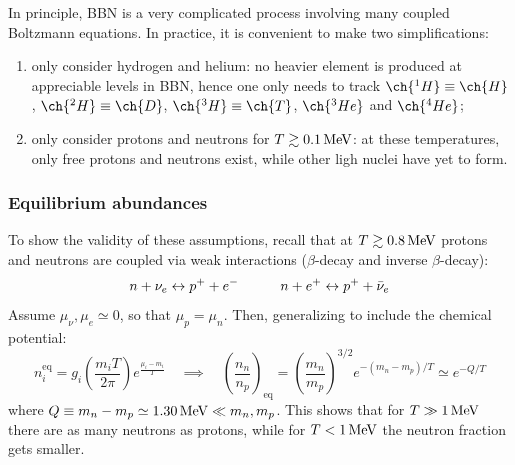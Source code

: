 In principle, BBN is a very complicated process involving many coupled Boltzmann equations. In practice, it is convenient to make two simplifications:
\begin{enumerate}
  \item only consider hydrogen and helium: no heavier element is produced at appreciable levels in BBN, hence one only needs to track $ \ch{^1H} \equiv \ch{H} $, $ \ch{^2H} \equiv \ch{D} $, $ \ch{^3H} \equiv \ch{T} $, $ \ch{^3He} $ and $ \ch{^4He} $;
  \item only consider protons and neutrons for $ T \gtrsim 0.1 \,\mathrm{MeV} $: at these temperatures, only free protons and neutrons exist, while other ligh nuclei have yet to form.
\end{enumerate}

\subsubsection{Equilibrium abundances}

 To show the validity of these assumptions, recall that at $ T \gtrsim 0.8 \,\mathrm{MeV} $ protons and neutrons are coupled via weak interactions ($ \beta $-decay and inverse $ \beta $-decay):
\begin{equation*}
  n + \nu_e \leftrightarrow p^+ + e^-
  \quad \qquad
  n + e^+ \leftrightarrow p^+ + \bar\nu_e
\end{equation*}
Assume $ \mu_\nu , \mu_e \simeq 0 $, so that $ \mu_p = \mu_n $. Then, generalizing  to include the chemical potential:
\begin{equation}
  n_i^\text{eq} = g_i \left( \frac{m_i T}{2\pi} \right) e^\frac{\mu_i - m_i}{T}
  \quad \implies \quad
  \left( \frac{n_n}{n_p} \right)_\text{eq} = \left( \frac{m_n}{m_p} \right)^{3/2} e^{-(m_n - m_p) /T} \simeq e^{-Q/T}
  \label{eq:n-to-p}
\end{equation}
where $ Q \equiv m_n - m_p \simeq 1.30 \,\mathrm{MeV} \ll m_n , m_p $. This shows that for $ T \gg 1 \,\mathrm{MeV} $ there are as many neutrons as protons, while for $ T < 1 \,\mathrm{MeV} $ the neutron fraction gets smaller\footnotemark.


